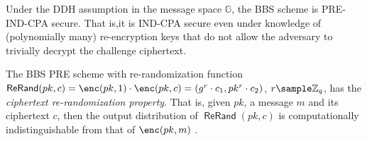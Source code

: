 \documentclass[runningheads]{llncs}
\newcommand{\Z}{\mathbb{Z}}
\DeclareMathOperator{\param}{\mathsf{Par}}
\DeclareMathOperator{\gen}{\mathsf{Gen}}
\DeclareMathOperator{\rekey}{\mathsf{ReKey}}
\DeclareMathOperator{\rerand}{\mathsf{ReRand}}
\renewcommand{\adv}{\mathsf{Adv}}
\begin{document}
\begin{proposition}
\label{prop:BBSindcpa}
Under the DDH assumption in the message space $\mathbb G$, the BBS scheme is PRE-IND-CPA secure. 
That is,it is IND-CPA secure even under knowledge of (polynomially many) re-encryption keys that do not allow the adversary to trivially decrypt the challenge ciphertext.
\end{proposition}


\begin{proposition}
\label{prop:BBSrerand}
The BBS PRE scheme with re-randomization function $\rerand(pk,c) = \enc(pk,1)\cdot \enc(pk,c) = (g^r\cdot c_1, pk^r\cdot c_2)$, $r\sample\Z_q$,  has the \emph{ciphertext re-randomization property}.
That is, given $pk$, a message $m$ and its ciphertext $c$, then the output distribution of $\rerand(pk,c)$ is computationally indistinguishable from that of $\enc(pk,m)$ .
\end{proposition}
\end{document}
